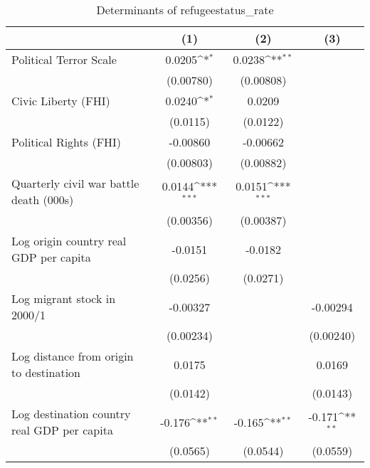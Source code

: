 \begin{table}[htbp]\centering
\def\sym#1{\ifmmode^{#1}\else\(^{#1}\)\fi}
\caption{Determinants of refugeestatus\_rate}
\begin{tabular}{l*{3}{c}}
\hline\hline
                    &\multicolumn{1}{c}{(1)}         &\multicolumn{1}{c}{(2)}         &\multicolumn{1}{c}{(3)}         \\
\hline
Political Terror Scale&      0.0205\sym{*}  &      0.0238\sym{**} &                     \\
                    &   (0.00780)         &   (0.00808)         &                     \\
[1em]
Civic Liberty (FHI) &      0.0240\sym{*}  &      0.0209         &                     \\
                    &    (0.0115)         &    (0.0122)         &                     \\
[1em]
Political Rights (FHI)&    -0.00860         &    -0.00662         &                     \\
                    &   (0.00803)         &   (0.00882)         &                     \\
[1em]
Quarterly civil war battle death (000s)&      0.0144\sym{***}&      0.0151\sym{***}&                     \\
                    &   (0.00356)         &   (0.00387)         &                     \\
[1em]
Log origin country real GDP per capita&     -0.0151         &     -0.0182         &                     \\
                    &    (0.0256)         &    (0.0271)         &                     \\
[1em]
Log migrant stock in 2000/1&    -0.00327         &                     &    -0.00294         \\
                    &   (0.00234)         &                     &   (0.00240)         \\
[1em]
Log distance from origin to destination&      0.0175         &                     &      0.0169         \\
                    &    (0.0142)         &                     &    (0.0143)         \\
[1em]
Log destination country real GDP per capita&      -0.176\sym{**} &      -0.165\sym{**} &      -0.171\sym{**} \\
                    &    (0.0565)         &    (0.0544)         &    (0.0559)         \\

\end{tabular}
\end{table}

